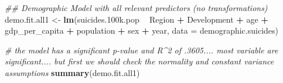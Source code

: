\documentclass[11pt,]{article}
\newenvironment{Shaded}{\begin{snugshade}}{\end{snugshade}}
\newcommand{\CommentTok}[1]{\textcolor[rgb]{0.56,0.35,0.01}{\textit{#1}}}
\newcommand{\DataTypeTok}[1]{\textcolor[rgb]{0.13,0.29,0.53}{#1}}
\newcommand{\FloatTok}[1]{\textcolor[rgb]{0.00,0.00,0.81}{#1}}
\newcommand{\KeywordTok}[1]{\textcolor[rgb]{0.13,0.29,0.53}{\textbf{#1}}}
\newcommand{\NormalTok}[1]{#1}
\newcommand{\OperatorTok}[1]{\textcolor[rgb]{0.81,0.36,0.00}{\textbf{#1}}}
\newcommand{\StringTok}[1]{\textcolor[rgb]{0.31,0.60,0.02}{#1}}
\begin{document}
\begin{Shaded}
\begin{Highlighting}[]
\CommentTok{## Demographic Model with all relevant predictors (no transformations)}
\NormalTok{demo.fit.all1 <-}\StringTok{ }\KeywordTok{lm}\NormalTok{(suicides}\FloatTok{.100}\NormalTok{k.pop  }\OperatorTok{~}\StringTok{ }\NormalTok{Region }\OperatorTok{+}\StringTok{ }\NormalTok{Development }\OperatorTok{+}\StringTok{ }\NormalTok{age }\OperatorTok{+}\StringTok{ }\NormalTok{gdp_per_capita }\OperatorTok{+}\StringTok{ }\NormalTok{population }\OperatorTok{+}\StringTok{ }\NormalTok{sex }\OperatorTok{+}\StringTok{ }\NormalTok{year, }\DataTypeTok{data =}\NormalTok{ demographic.suicides)}

\CommentTok{# the model has a significant p-value and R^2 of .3605.... most variable are significant.... but first we should check the normality and constant variance assumptions}
\KeywordTok{summary}\NormalTok{(demo.fit.all1)}
\end{Highlighting}
\end{Shaded}
\end{document}
